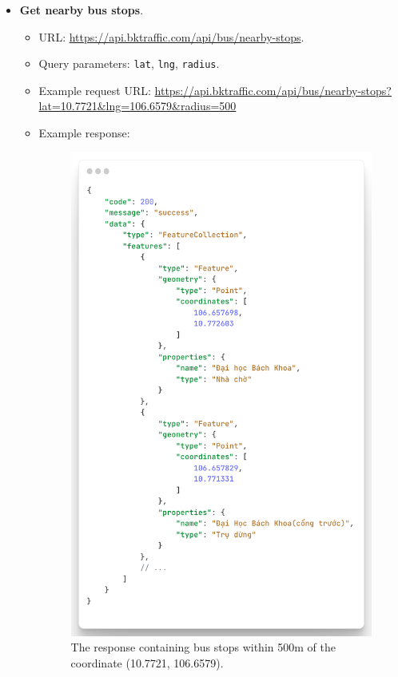 \begin{itemize}
    \item \textbf{Get nearby bus stops}.
    \begin{itemize}
        \item URL: \url{https://api.bktraffic.com/api/bus/nearby-stops}.
        \item Query parameters: \lstinline{lat}, \lstinline{lng}, \lstinline{radius}.
        \item Example request URL: \url{https://api.bktraffic.com/api/bus/nearby-stops?lat=10.7721&lng=106.6579&radius=500}
        \item Example response: 
        \begin{figure}[H]
            \includegraphics[width=\textwidth]{assets/images/Implementation/nearby_bus_response.png}
            \caption{The response containing bus stops within 500m of the coordinate (10.7721, 106.6579).}
            \label{fig:nearby_stop_response}
        \end{figure}
    \end{itemize}


\end{itemize}
